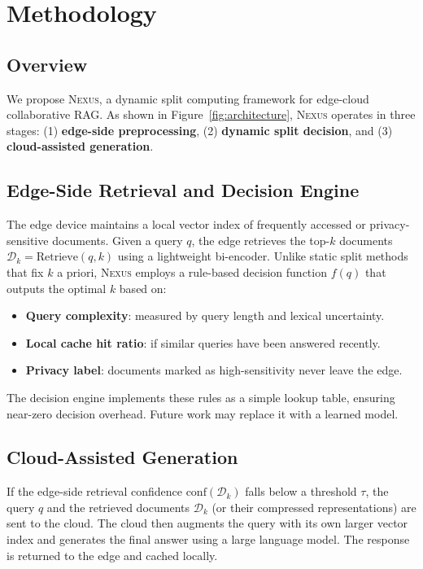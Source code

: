 \section{Methodology}
\label{sec:method}

\subsection{Overview}
We propose \textsc{Nexus}, a dynamic split computing framework for edge-cloud collaborative RAG. As shown in Figure~\ref{fig:architecture}, \textsc{Nexus} operates in three stages: (1) \textbf{edge-side preprocessing}, (2) \textbf{dynamic split decision}, and (3) \textbf{cloud-assisted generation}.

\subsection{Edge-Side Retrieval and Decision Engine}
The edge device maintains a local vector index of frequently accessed or privacy-sensitive documents. Given a query $q$, the edge retrieves the top-$k$ documents $\mathcal{D}_k = \text{Retrieve}(q, k)$ using a lightweight bi-encoder. Unlike static split methods that fix $k$ a priori, \textsc{Nexus} employs a rule-based decision function $f(q)$ that outputs the optimal $k$ based on:
\begin{itemize}
    \item \textbf{Query complexity}: measured by query length and lexical uncertainty.
    \item \textbf{Local cache hit ratio}: if similar queries have been answered recently.
    \item \textbf{Privacy label}: documents marked as high-sensitivity never leave the edge.
\end{itemize}
The decision engine implements these rules as a simple lookup table, ensuring near-zero decision overhead. Future work may replace it with a learned model.

\subsection{Cloud-Assisted Generation}
If the edge-side retrieval confidence $\text{conf}(\mathcal{D}_k)$ falls below a threshold $\tau$, the query $q$ and the retrieved documents $\mathcal{D}_k$ (or their compressed representations) are sent to the cloud. The cloud then augments the query with its own larger vector index and generates the final answer using a large language model. The response is returned to the edge and cached locally.

